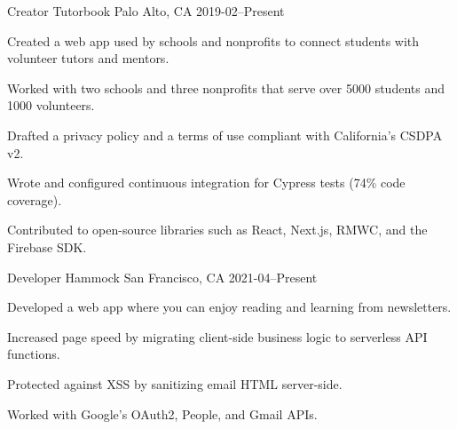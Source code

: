 

\begin{cventries}

  \cventry
    {Creator} %
    {Tutorbook} %
    {Palo Alto, CA} %
    {2019-02–Present} %
    {
      \begin{cvitems} %
        \item {Created a web app used by schools and nonprofits to connect students with volunteer tutors and mentors.}
        \item {Worked with two schools and three nonprofits that serve over 5000 students and 1000 volunteers.}
        \item {Drafted a privacy policy and a terms of use compliant with California's CSDPA v2.}
        \item {Wrote and configured continuous integration for Cypress tests (74\% code coverage).}
        \item {Contributed to open-source libraries such as React, Next.js, RMWC, and the Firebase SDK.}
      \end{cvitems}
    }

  \cventry
    {Developer} %
    {Hammock} %
    {San Francisco, CA} %
    {2021-04–Present} %
    {
      \begin{cvitems} %
        \item {Developed a web app where you can enjoy reading and learning from newsletters.}
        \item {Increased page speed by migrating client-side business logic to serverless API functions.}
        \item {Protected against XSS by sanitizing email HTML server-side.}
        \item {Worked with Google's OAuth2, People, and Gmail APIs.}
      \end{cvitems}
    }


\end{cventries}
